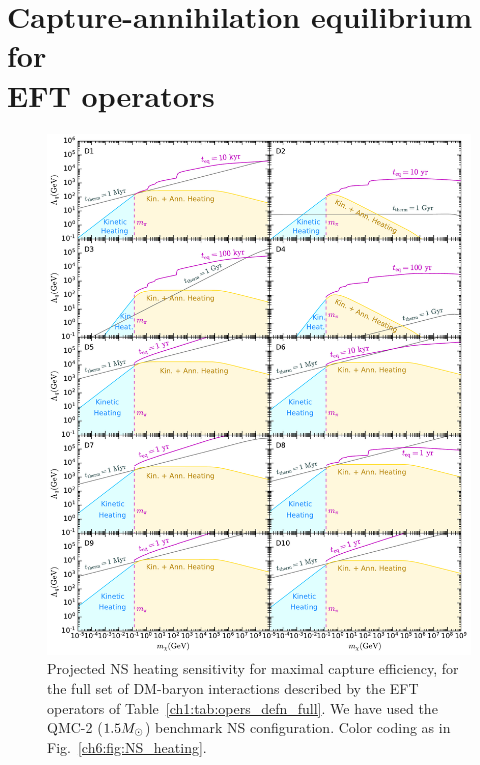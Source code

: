 \section[Capture-annihilation equilibrium for EFT operators]{Capture-annihilation equilibrium for\\EFT operators}
\label{app:sec:resultsEFTop}

\begin{figure}
    \centering
    \includegraphics[width=\textwidth]{img/thermalisation/ann_heat_sensitivity.pdf}    
    \caption[Projected NS heating sensitivity for maximal capture efficiency, for the full set of DM-baryon interactions described by the EFT operators of Table~\ref{ch1:tab:opers_defn_full}.]{Projected NS heating sensitivity for maximal capture efficiency, for the full set of DM-baryon interactions described by the EFT operators of Table~\ref{ch1:tab:opers_defn_full}. We have used the QMC-2 ($1.5M_\odot$) benchmark NS configuration.  
    Color coding as in Fig.~\ref{ch6:fig:NS_heating}. 
    }
    \label{app:fig:NS_heating2}
\end{figure}




